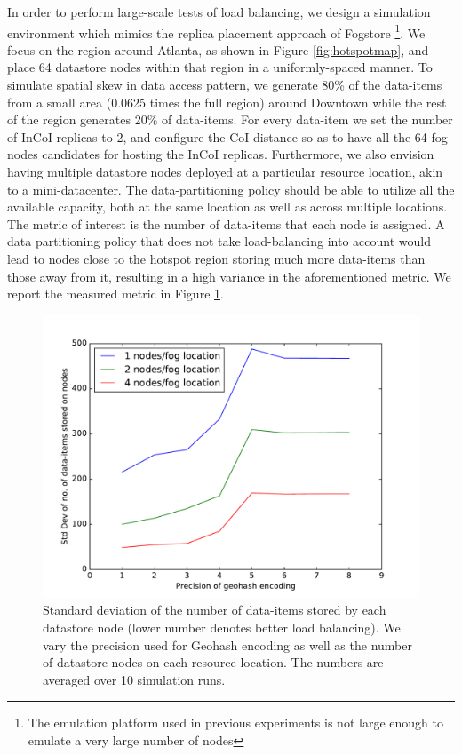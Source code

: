 \par In order to perform large-scale tests of load balancing, we design a simulation environment which mimics the replica placement approach of Fogstore \footnote{The emulation platform used in previous experiments is not large enough to emulate a very large number of nodes}. We focus on the region around Atlanta, as shown in Figure \ref{fig:hotspotmap}, and place 64 datastore nodes within that region in a uniformly-spaced manner. To simulate spatial skew in data access pattern, we generate 80\% of the data-items from a small area (0.0625 times the full region) around Downtown while the rest of the region generates 20\% of data-items. For every data-item we set the number of InCoI replicas to 2, and configure the CoI distance so as to have all the 64 fog nodes candidates for hosting the InCoI replicas. Furthermore, we also envision having multiple datastore nodes deployed at a particular resource location, akin to a mini-datacenter. The data-partitioning policy should be able to utilize all the available capacity, both at the same location as well as across multiple locations. The metric of interest is the number of data-items that each node is assigned. A data partitioning policy that does not take load-balancing into account would lead to nodes close to the hotspot region storing much more data-items than those away from it, resulting in a high variance in the aforementioned metric. We report the measured metric in Figure \ref{fig:loadbalancing}.
\begin{figure}[h]
\centering
\includegraphics[width=0.75\columnwidth]{figures/fogstore/evals/hotspot/stdDevs.pdf}
\caption{Standard deviation of the number of data-items stored by each datastore node (lower number denotes better load balancing). We vary the precision used for Geohash encoding as well as the number of datastore nodes on each resource location. The numbers are averaged over 10 simulation runs.}
\label{fig:loadbalancing}
\end{figure}
